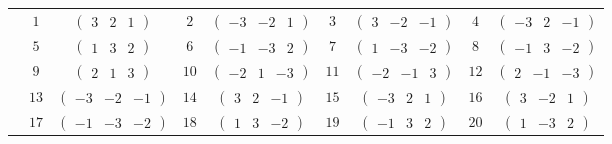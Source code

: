 \documentclass[fleqn,10pt,landscape]{article}
\begin{document}
\begin{itemize}
{\begin{center}
\begin{longtable}{ccccccccc}
 & $ 1 $ & $ \begin{pmatrix} 3 & 2 & 1 \end{pmatrix} $ & $ 2 $ & $ \begin{pmatrix} -3 & -2 & 1 \end{pmatrix} $ & $ 3 $ & $ \begin{pmatrix} 3 & -2 & -1 \end{pmatrix} $ & $ 4 $ & $ \begin{pmatrix} -3 & 2 & -1 \end{pmatrix} $ \\
& $ 5 $ & $ \begin{pmatrix} 1 & 3 & 2 \end{pmatrix} $ & $ 6 $ & $ \begin{pmatrix} -1 & -3 & 2 \end{pmatrix} $ & $ 7 $ & $ \begin{pmatrix} 1 & -3 & -2 \end{pmatrix} $ & $ 8 $ & $ \begin{pmatrix} -1 & 3 & -2 \end{pmatrix} $ \\
& $ 9 $ & $ \begin{pmatrix} 2 & 1 & 3 \end{pmatrix} $ & $ 10 $ & $ \begin{pmatrix} -2 & 1 & -3 \end{pmatrix} $ & $ 11 $ & $ \begin{pmatrix} -2 & -1 & 3 \end{pmatrix} $ & $ 12 $ & $ \begin{pmatrix} 2 & -1 & -3 \end{pmatrix} $ \\
& $ 13 $ & $ \begin{pmatrix} -3 & -2 & -1 \end{pmatrix} $ & $ 14 $ & $ \begin{pmatrix} 3 & 2 & -1 \end{pmatrix} $ & $ 15 $ & $ \begin{pmatrix} -3 & 2 & 1 \end{pmatrix} $ & $ 16 $ & $ \begin{pmatrix} 3 & -2 & 1 \end{pmatrix} $ \\
& $ 17 $ & $ \begin{pmatrix} -1 & -3 & -2 \end{pmatrix} $ & $ 18 $ & $ \begin{pmatrix} 1 & 3 & -2 \end{pmatrix} $ & $ 19 $ & $ \begin{pmatrix} -1 & 3 & 2 \end{pmatrix} $ & $ 20 $ & $ \begin{pmatrix} 1 & -3 & 2 \end{pmatrix} $ \\

\end{longtable}
\end{center}}
\end{itemize}
\end{document}
